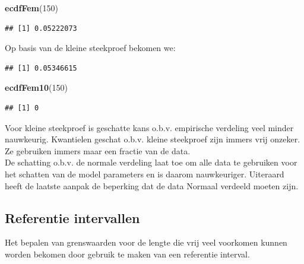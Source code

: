 \documentclass[
  12pt,dutch]{book}
\newenvironment{Shaded}{\begin{snugshade}}{\end{snugshade}}
\newcommand{\DecValTok}[1]{\textcolor[rgb]{0.00,0.00,0.81}{#1}}
\newcommand{\FunctionTok}[1]{\textcolor[rgb]{0.13,0.29,0.53}{\textbf{#1}}}
\newcommand{\NormalTok}[1]{#1}
\newcommand{\SpecialCharTok}[1]{\textcolor[rgb]{0.81,0.36,0.00}{\textbf{#1}}}
\theoremstyle{definition}
\theoremstyle{definition}
\theoremstyle{definition}
\theoremstyle{definition}
\theoremstyle{remark}
\begin{document}
\begin{Shaded}
\begin{Highlighting}[]
\FunctionTok{ecdfFem}\NormalTok{(}\DecValTok{150}\NormalTok{)}
\end{Highlighting}
\end{Shaded}

\begin{verbatim}
## [1] 0.05222073
\end{verbatim}

Op basis van de kleine steekproef bekomen we:

\begin{Shaded}
\end{Shaded}

\begin{verbatim}
## [1] 0.05346615
\end{verbatim}

\begin{Shaded}
\begin{Highlighting}[]
\FunctionTok{ecdfFem10}\NormalTok{(}\DecValTok{150}\NormalTok{)}
\end{Highlighting}
\end{Shaded}

\begin{verbatim}
## [1] 0
\end{verbatim}

Voor kleine steekproef is geschatte kans o.b.v. empirische verdeling veel minder nauwkeurig.
Kwantielen geschat o.b.v. kleine steekproef zijn immers vrij onzeker. Ze gebruiken immers maar een fractie van de data.\\
De schatting o.b.v. de normale verdeling laat toe om alle data te gebruiken voor het schatten van de model parameters en is daarom nauwkeuriger. Uiteraard heeft de laatste aanpak de beperking dat de data Normaal verdeeld moeten zijn.

\subsection{Referentie intervallen}\label{referentie-intervallen}

Het bepalen van grenswaarden voor de lengte die vrij veel voorkomen kunnen worden bekomen door gebruik te maken van een referentie interval.
\end{document}
